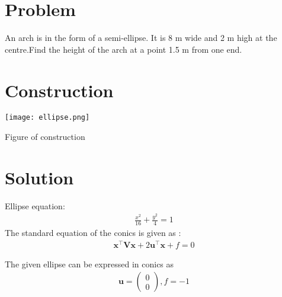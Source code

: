\documentclass[10pt, a4paper]{article}
\title{\mytitle}
\author{\myauthor\hspace{1em}\\\contact\\FWC22011\hspace{6.5em}IITH\hspace{0.5em}\mymodule\hspace{6em}Matrix:conic}
\date{}
\newcommand{\myvec}[1]{\ensuremath{\begin{pmatrix}#1\end{pmatrix}}}
\let\vec\mathbf
\begin{document}
	\maketitle
	\tableofcontents
   \section{Problem}
An arch is in the form of a semi-ellipse. It is 8 m wide and 2 m high at the centre.Find the height of the arch at a point 1.5 m from one end.

\section{Construction}
  \texttt{[image: ellipse.png]}
  	\begin{center}
  Figure of construction
  	\end{center}
  \section{Solution}
Ellipse equation:
\begin{align}
\frac{x^2}{16}+\frac{y^2}{4}=1
\end{align}
The standard equation of the conics is given as :
\begin{align}
\vec{x}^{\top}\vec{V}\vec{x}+2\vec{u}^{\top}\vec{x}+f=0
\label{eq:conic}
\end{align}

The given ellipse can be expressed in  conics as\\ 
\begin{align}
\vec{u} = \myvec{0 \\0} , f =-1 
\end{align}
\end{document}
